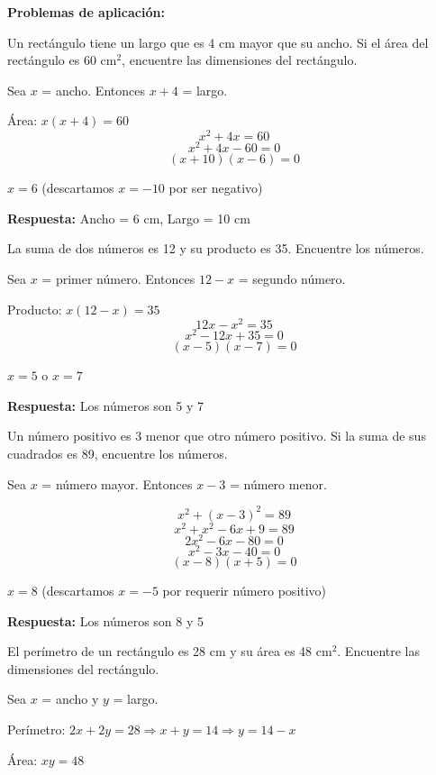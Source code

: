 \begin{exercise}
\problem \textbf{Problemas de aplicación:}

\problem Un rectángulo tiene un largo que es 4 cm mayor que su ancho. Si el área del rectángulo es 60 cm$^2$, encuentre las dimensiones del rectángulo.

\begin{solucion}
Sea $x$ = ancho. Entonces $x + 4$ = largo.

Área: $x(x + 4) = 60$
$$x^2 + 4x = 60$$
$$x^2 + 4x - 60 = 0$$
$$(x + 10)(x - 6) = 0$$

$x = 6$ (descartamos $x = -10$ por ser negativo)

\textbf{Respuesta:} Ancho = 6 cm, Largo = 10 cm
\end{solucion}

\problem La suma de dos números es 12 y su producto es 35. Encuentre los números.

\begin{solucion}
Sea $x$ = primer número. Entonces $12 - x$ = segundo número.

Producto: $x(12 - x) = 35$
$$12x - x^2 = 35$$
$$x^2 - 12x + 35 = 0$$
$$(x - 5)(x - 7) = 0$$

$x = 5$ o $x = 7$

\textbf{Respuesta:} Los números son 5 y 7
\end{solucion}

\problem Un número positivo es 3 menor que otro número positivo. Si la suma de sus cuadrados es 89, encuentre los números.

\begin{solucion}
Sea $x$ = número mayor. Entonces $x - 3$ = número menor.

$$x^2 + (x - 3)^2 = 89$$
$$x^2 + x^2 - 6x + 9 = 89$$
$$2x^2 - 6x - 80 = 0$$
$$x^2 - 3x - 40 = 0$$
$$(x - 8)(x + 5) = 0$$

$x = 8$ (descartamos $x = -5$ por requerir número positivo)

\textbf{Respuesta:} Los números son 8 y 5
\end{solucion}

\problem El perímetro de un rectángulo es 28 cm y su área es 48 cm$^2$. Encuentre las dimensiones del rectángulo.

\begin{solucion}
Sea $x$ = ancho y $y$ = largo.

Perímetro: $2x + 2y = 28 \Rightarrow x + y = 14 \Rightarrow y = 14 - x$

Área: $xy = 48$


\end{solucion}
\end{exercise}
